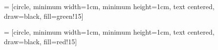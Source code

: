 \renewenvironment{quote}
{\list{}{\em\leftmargin=1em}\item[]}{\endlist\relax}


\setlength{\parindent}{1em} %

\midsloppy %

\checkandfixthelayout %

 = [circle, minimum width=1cm, minimum height=1cm, text centered, draw=black, fill=green!15]

 = [circle, minimum width=1cm, minimum height=1cm, text centered, draw=black, fill=red!15]